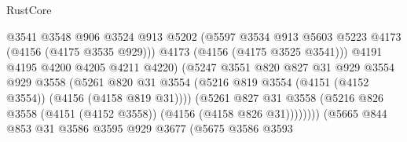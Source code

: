 \begin{lexlean}{RustCore}
\begin{coremodule}
                                      @3541
                                      @3548
                                      @906
                                      @3524
                                      @913
                                      @5202
                                      (@5597
                                        @3534
                                        @913
                                        @5603
                                        @5223
                                        @4173
                                        (@4156 (@4175 @3535 @929)))
                                      @4173
                                      (@4156 (@4175 @3525 @3541)))
                                    @4191
                                    @4195
                                    @4200
                                    @4205
                                    @4211
                                    @4220)
                                  (@5247
                                    @3551
                                    @820
                                    @827
                                    @31
                                    @929
                                    @3554
                                    @929
                                    @3558
                                    (@5261
                                      @820
                                      @31
                                      @3554
                                      (@5216
                                        @819
                                        @3554
                                        (@4151 (@4152 @3554))
                                        (@4156 (@4158 @819 @31))))
                                    (@5261
                                      @827
                                      @31
                                      @3558
                                      (@5216
                                        @826
                                        @3558
                                        (@4151 (@4152 @3558))
                                        (@4156 (@4158 @826 @31))))))))
                            (@5665
                              @844
                              @853
                              @31
                              @3586
                              @3595
                              @929
                              @3677
                              (@5675
                                @3586
                                @3593

\end{coremodule}
\end{lexlean}

